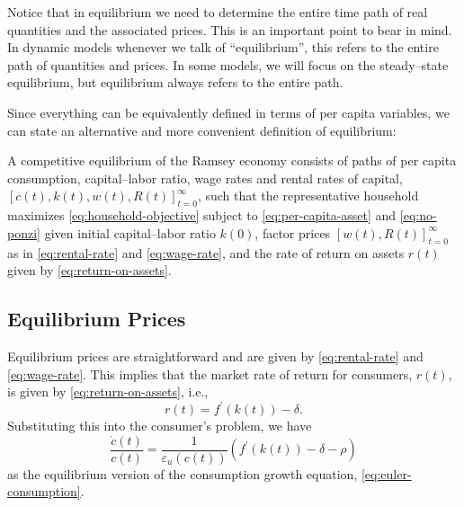 \documentclass[\topdir/lecture\_notes.tex]{subfiles}
\begin{document}
Notice that in equilibrium we need to determine the entire time path of real quantities and the associated prices.
This is an important point to bear in mind.
In dynamic models whenever we talk of ``equilibrium'', this refers to the entire path of quantities and prices.
In some models, we will focus on the steady--state equilibrium, but equilibrium always refers to the entire path.

Since everything can be equivalently defined in terms of per capita variables, we can state an alternative and more convenient definition of equilibrium:

\begin{defn}\label{def:competitive-equilibrium-2}
  A competitive equilibrium of the Ramsey economy consists of paths of per capita consumption, capital--labor ratio, wage rates and rental rates of capital, \([c(t), k(t), w(t), R(t)]_{t=0}^{\infty}\), such that the representative household maximizes \eqref{eq:household-objective} subject to \eqref{eq:per-capita-asset} and \eqref{eq:no-ponzi} given initial capital--labor ratio \(k(0)\), factor prices \([w(t), R(t)]_{t=0}^{\infty}\) as in \eqref{eq:rental-rate} and \eqref{eq:wage-rate}, and the rate of return on assets \(r(t)\) given by \eqref{eq:return-on-assets}.
\end{defn}

\subsection{Equilibrium Prices}
Equilibrium prices are straightforward and are given by \eqref{eq:rental-rate} and \eqref{eq:wage-rate}. This implies that the market rate of return for consumers, \(r(t)\), is given by \eqref{eq:return-on-assets}, i.e.,
\[
  r(t)=f^{\prime}(k(t))-\delta.
\]
Substituting this into the consumer's problem, we have
\begin{equation}
  \frac{\dot{c}(t)}{c(t)}=\frac{1}{\varepsilon_{u}(c(t))}\left(f^{\prime}(k(t))-\delta-\rho\right)
  \label{eq:equilibrium-euler}
\end{equation}
as the equilibrium version of the consumption growth equation, \eqref{eq:euler-consumption}.
\end{document}
